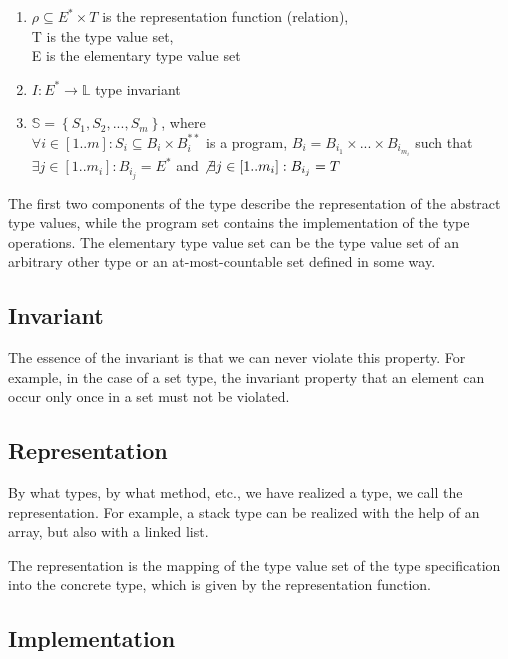 \documentclass[margin=0px]{article}
\begin{document}
\begin{enumerate}
    \item $\rho \subseteq E^{*} \times T$ is the representation function (relation),\\
          T is the type value set,\\
          E is the elementary type value set
    \item $I : E^{*} \to \mathbb{L} $ type invariant
    \item $\mathbb{S} = \left\{ {S_{1},S_{2},...,S_{m}}\right\}$, where\\
          $\forall i \in [1..m]: S_{i} \subseteq B_{i} \times B_{i}^{**}$ is a program, $B_{i} = B_{i_{1}} \times ... \times B_{i_{m_{i}}}$ such that\\
          $\exists j \in [1..m_{i}]: B_{i_{j}} = E^{*}$ and $\not \exists j \in [1..m_{i}]: B_{i_{j}} = T$
\end{enumerate}

The first two components of the type describe the representation of the abstract type values, while the program set contains the implementation of the type operations. The elementary type value set can be the type value set of an arbitrary other type or an at-most-countable set defined in some way.

\subsection{Invariant}

The essence of the invariant is that we can never violate this property. For example, in the case of a set type, the invariant property that an element can occur only once in a set must not be violated.

\subsection{Representation}

By what types, by what method, etc., we have realized a type, we call the representation. For example,
a stack type can be realized with the help of an array, but also with a linked list.

The representation is the mapping of the type value set of the type specification into the concrete type, which is given by the representation function.

\subsection{Implementation}
\end{document}
